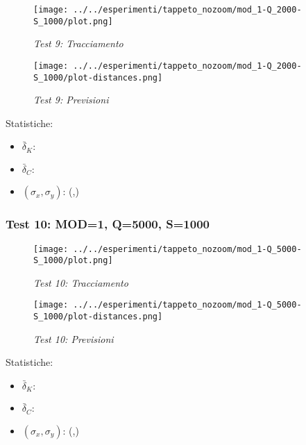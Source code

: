 \begin{figure}[hb]
\centering
\texttt{[image: ../../esperimenti/tappeto\_nozoom/mod\_1-Q\_2000-S\_1000/plot.png]}
\caption{\textit{Test 9: Tracciamento}\label{fig:Test 9}}
\end{figure}

\begin{figure}[hb]
\centering
\texttt{[image: ../../esperimenti/tappeto\_nozoom/mod\_1-Q\_2000-S\_1000/plot-distances.png]}
\caption{\textit{Test 9: Previsioni}\label{fig:Test 9}}
\end{figure}

Statistiche:
\begin{itemize}
\item \begin{math} \bar \delta_K:  \end{math}
\item \begin{math} \bar \delta_C:  \end{math}
\item \begin{math}(\sigma_x,\sigma_y)\end{math}: (,)
\end{itemize}

\newpage
\subsubsection{Test 10: MOD=1, Q=5000, S=1000}

\begin{figure}[hb]
\centering
\texttt{[image: ../../esperimenti/tappeto\_nozoom/mod\_1-Q\_5000-S\_1000/plot.png]}
\caption{\textit{Test 10: Tracciamento}\label{fig:Test 10}}
\end{figure}

\begin{figure}[hb]
\centering
\texttt{[image: ../../esperimenti/tappeto\_nozoom/mod\_1-Q\_5000-S\_1000/plot-distances.png]}
\caption{\textit{Test 10: Previsioni}\label{fig:Test 10}}
\end{figure}

Statistiche:
\begin{itemize}
\item \begin{math} \bar \delta_K:  \end{math}
\item \begin{math} \bar \delta_C:  \end{math}
\item \begin{math}(\sigma_x,\sigma_y)\end{math}: (,)
\end{itemize}

